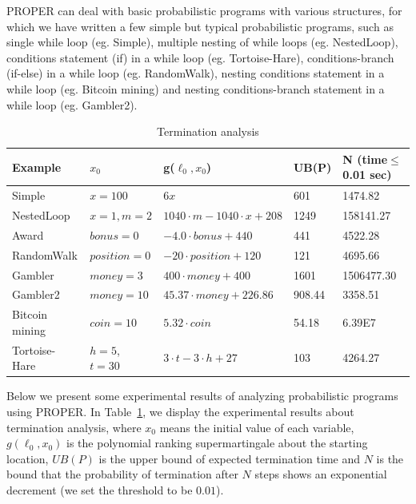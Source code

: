 \documentclass[runningheads]{llncs}
\begin{document}
PROPER can deal with basic probabilistic programs with various structures, for which we have written a few simple but typical probabilistic programs, such as single while loop (eg. Simple), multiple nesting of while loops (eg. NestedLoop), conditions statement (if) in a while loop (eg. Tortoise-Hare), conditions-branch (if-else) in a while loop (eg. RandomWalk), nesting conditions statement in a while loop (eg. Bitcoin mining) and nesting conditions-branch statement in a while loop (eg. Gambler2).



\begin{table}[htb]
	\centering
	\caption{Termination analysis}  
	\label{TerminationResult} 
	\begin{center}  
		\begin{tabular}{|l|l|l|l|l|}  
			\hline  	
			Example & $x_0$ & g($\ell_0,x_0$) & UB(P) & N (time$\leq$0.01 sec)\\ \hline  	
			Simple & $x=100$  & $6x$ & 601 & 1474.82 \\ \hline  		
			NestedLoop & $x=1, m=2$ & $1040\cdot m-1040\cdot x+208$ & 1249 & 158141.27 \\  \hline  
			Award & $bonus=0$ & $-4.0\cdot bonus+440$ & 441 &4522.28 \\  \hline  
			RandomWalk & $position=0$ & $-20\cdot position+120$ & 121 & 4695.66 \\  \hline  
			Gambler& $money=3$ & $400\cdot money+400$ & 1601 & 1506477.30 \\ \hline  		 
			Gambler2 & $money=10$ & $45.37 \cdot money+226.86$ & 908.44 & 3358.51 \\  \hline  
			Bitcoin mining & $coin=10$ & $5.32 \cdot coin$ & 54.18 & 6.39E7 \\  \hline 
			Tortoise-Hare & $h=5$, $t=30$ & $3\cdot t-3 \cdot h+27$ & 103 & 4264.27 \\  \hline  
		\end{tabular}  
	\end{center}  
\end{table}

Below we present some experimental results of analyzing probabilistic programs using PROPER. In Table~\ref{TerminationResult}, we display the experimental results about termination analysis, where $x_0$ means the initial value of each variable, $g(\ell_0,x_0)$ is the polynomial ranking supermartingale about the starting location, $UB(P)$ is the upper bound of expected termination time and $N$ is the bound that the probability of termination after $N$ steps shows an exponential decrement (we set the threshold to  be $0.01$).
\end{document}
